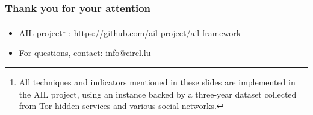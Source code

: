 \documentclass[10pt,aspectratio=169, colorlinks=true, linkcolor=circlBlue]{beamer}
\begin{document}

\begin{frame}
	\frametitle{Thank you for your attention}
	\begin{itemize}
		\item AIL project\footnote{All techniques and indicators mentioned in these slides are implemented in the AIL project, using an instance backed by a three-year dataset collected from Tor hidden services and various social networks.}
: \url{https://github.com/ail-project/ail-framework}
		\item For questions, contact: \href{mailto:info@circl.lu}{info@circl.lu}
	\end{itemize}
\end{frame}
\end{document}
